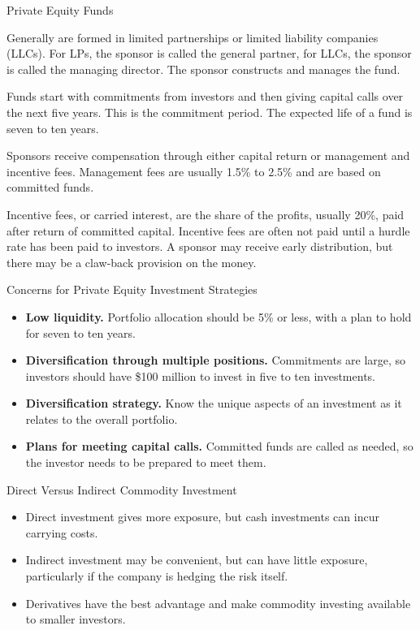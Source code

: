 \documentclass[../custom]{flashcards}
\begin{document}
\begin{flashcard}{Private Equity Funds}
    \begin{flushleft}
        Generally are formed in limited partnerships or limited liability companies (LLCs). For LPs, the sponsor is called the general partner, for LLCs, the sponsor is called the managing director. The sponsor constructs and manages the fund.\newline

        Funds start with commitments from investors and then giving capital calls over the next five years. This is the commitment period. The expected life of a fund is seven to ten years.\newline

        Sponsors receive compensation through either capital return or management and incentive fees. Management fees are usually 1.5\% to 2.5\% and are based on committed funds.\newline

        Incentive fees, or carried interest, are the share of the profits, usually 20\%, paid after return of committed capital. Incentive fees are often not paid until a hurdle rate has been paid to investors. A sponsor may receive early distribution, but there may be a claw-back provision on the money.
    \end{flushleft}
\end{flashcard}

\begin{flashcard}{Concerns for Private Equity Investment Strategies}
    \begin{itemize}
        \item \textbf{Low liquidity.} Portfolio allocation should be 5\% or less, with a plan to hold for seven to ten years.
        \item \textbf{Diversification through multiple positions.} Commitments are large, so investors should have \$100 million to invest in five to ten investments.
        \item \textbf{Diversification strategy.} Know the unique aspects of an investment as it relates to the overall portfolio.
        \item \textbf{Plans for meeting capital calls.} Committed funds are called as needed, so the investor needs to be prepared to meet them.
    \end{itemize}
\end{flashcard}

\begin{flashcard}{Direct Versus Indirect Commodity Investment}
    \begin{itemize}
        \item Direct investment gives more exposure, but cash investments can incur carrying costs.
        \item Indirect investment may be convenient, but can have little exposure, particularly if the company is hedging the risk itself.
        \item Derivatives have the best advantage and make commodity investing available to smaller investors.
    \end{itemize}
\end{flashcard}
\end{document}
